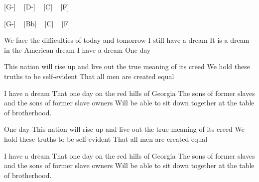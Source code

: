
[G-] ~ [D-] ~ [C] ~ [F]


[G-] ~ [Bb] ~ [C] ~ [F]

 We face the difficulties of today and tomorrow
I still have a dream
It is a dream in the American dream
I have a dream
One day

This nation will rise up and live out the true meaning of its creed
We hold these truths to be self-evident
That all men are created equal

I have a dream
That one day on the red hills of Georgia
The sons of former slaves and the sons of former slave owners
Will be able to sit down together at the table of brotherhood.

One day
This nation will rise up and live out the true meaning of its creed
We hold these truths to be self-evident
That all men are created equal


I have a dream
That one day on the red hills of Georgia
The sons of former slaves and the sons of former slave owners
Will be able to sit down together at the table of brotherhood. 